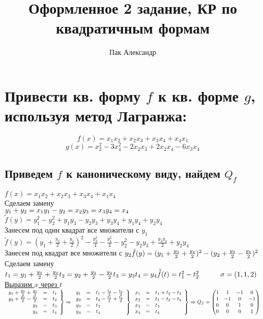 \documentclass[12pt]{article}
\title{Оформленное 2 задание, КР по квадратичным формам}
\author{Пак Александр}
\theoremstyle{remark}
\theoremstyle{definition}
\newcommand{\0}{\mathbb{0}}
\newcommand{\n}{\\[6pt]}
\def\slide#1{\phantom{}\hspace{#1}}
\begin{document}
	\maketitle
	\newpage
	\section{Привести кв. форму $f$ к кв. форме $g$, \\используя метод Лагранжа:}
	\[f(x) = x_1 x_2 + x_2 x_3 + x_3 x_4 + x_4 x_1\]
	\[g(x) = x_2^2 - 3 x_4^2 - 2x_2 x_3 + 2 x_2 x_4 - 6 x_3 x_4\]
	\subsection{Приведем $f$ к каноническому виду, найдем $Q_f$}
	$f(x) = x_1 x_2 + x_2 x_3 + x_3 x_4 + x_1 x_4$\n 
	Сделаем замену\n 
	$y_1 + y_2 = x_1\\
	y_1 - y_2 = x_2\\
	y_3 = x_3\\
	y_4 = x_4$\n 
	$\tilde{f}(y) = y_1^2 - y_2^2 + y_1 y_3 - y_2 y_3 + y_3 y_4 + y_1 y_4 + y_2 y_4$\n
	Занесем под один квадрат все множители с $y_1$\n 
	$\tilde{f}(y) = (y_1 + \frac{y_3}{2} + \frac{y_4}{2})^2 - \frac{y_3^2}{4} - \frac{y_4^2}{4} - y_2^2 - y_2y_3 + \frac{y_3 y_4}{2} + y_2 y_4$\n
	Занесем под квадрат все множители с $y_2\n 
	\tilde{f}(y) = (y_1 + \frac{y_3}{2} + \frac{y_4}{2})^2 - (y_2 + \frac{y_3}{2} - \frac{y_4}{2})^2$\n
	Сделаем замену\n 
	$t_1 = y_1 + \frac{y_3}{2} + \frac{y_4}{2}\\
	t_2 = y_2 + \frac{y_3}{2} - \frac{y_4}{2}\\
	t_3 = y_3\\
	t_4 = y_4\n
	\tilde{\tilde{f}}(t) = t_1^2 - t_2^2 \slide{30px} \sigma = (1, 1, 2)$\n
	\underline{Выразим $x$ через $t$}\n 
	$
	\left.
	\begin{array}{rcl}
		y_1 + \frac{y_3}{2} + \frac{y_4}{2} &=& t_1\\
		y_2 + \frac{y_3}{2} - \frac{y_4}{2} &=& t_2\\
		y_3 &=& t_3\\
		y_4 &=& t_4
	\end{array}\right\} \Rightarrow \left.\begin{array}{rcl}
		y_1 &=& t_1 - \frac{t_3}{2} - \frac{t_4}{2}\\
		y_2 &=& t_2 - \frac{t_3}{2} + \frac{t_4}{2}\\
		y_3 &=& t_3\\
		y_4 &=& t_4
	\end{array}\right\}\n 
	\left.
	\begin{array}{rcl}
		x_1 &=& t_1 + t_2 - t_3\\
		x_2 &=& t_1 - t_2 -t_4\\
		x_3 &=& t_3\\
		x_4 &=& t_4
	\end{array}\right\} \Rightarrow Q_f = \begin{pmatrix}
		1 & 1 & -1 & 0\\
		1 & -1 & 0 & -1\\
		0 & 0 & 1 & 0\\
		0 & 0 & 0 & 1
	\end{pmatrix}$
\end{document}
